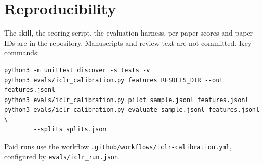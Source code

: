 \documentclass[11pt,a4paper]{article}
\newcommand{\code}[1]{\texttt{#1}}
\begin{document}
\section*{Reproducibility}
The skill, the scoring script, the evaluation harness, per-paper scores and paper IDs are in the
repository. Manuscripts and review text are not committed. Key commands:
{\small\begin{verbatim}
python3 -m unittest discover -s tests -v
python3 evals/iclr_calibration.py features RESULTS_DIR --out features.jsonl
python3 evals/iclr_calibration.py pilot sample.jsonl features.jsonl
python3 evals/iclr_calibration.py evaluate sample.jsonl features.jsonl \
        --splits splits.json
\end{verbatim}}
Paid runs use the workflow \code{.github/workflows/}\allowbreak\code{iclr-calibration.yml},
configured by \code{evals/iclr\_run.json}.
\end{document}
